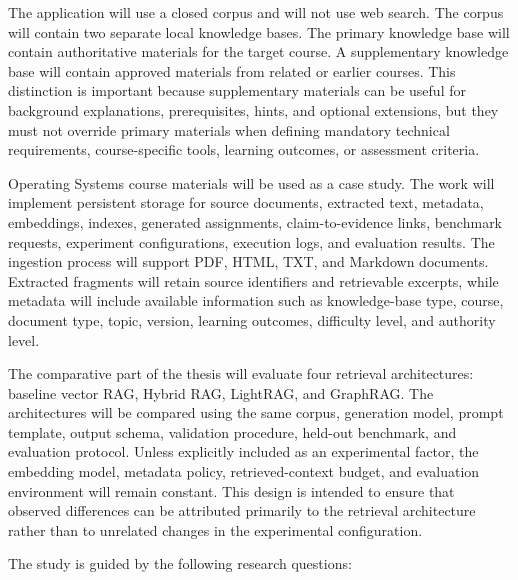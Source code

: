 \documentclass[12pt,a4paper]{report}
\numberwithin{equation}{chapter}
\begin{document}
The application will use a closed corpus and will not use web search. The corpus will contain two separate local knowledge bases. The primary knowledge base will contain authoritative materials for the target course. A supplementary knowledge base will contain approved materials from related or earlier courses. This distinction is important because supplementary materials can be useful for background explanations, prerequisites, hints, and optional extensions, but they must not override primary materials when defining mandatory technical requirements, course-specific tools, learning outcomes, or assessment criteria.

Operating Systems course materials will be used as a case study. The work will implement persistent storage for source documents, extracted text, metadata, embeddings, indexes, generated assignments, claim-to-evidence links, benchmark requests, experiment configurations, execution logs, and evaluation results. The ingestion process will support PDF, HTML, TXT, and Markdown documents. Extracted fragments will retain source identifiers and retrievable excerpts, while metadata will include available information such as knowledge-base type, course, document type, topic, version, learning outcomes, difficulty level, and authority level.

The comparative part of the thesis will evaluate four retrieval architectures: baseline vector RAG, Hybrid RAG, LightRAG, and GraphRAG. The architectures will be compared using the same corpus, generation model, prompt template, output schema, validation procedure, held-out benchmark, and evaluation protocol. Unless explicitly included as an experimental factor, the embedding model, metadata policy, retrieved-context budget, and evaluation environment will remain constant. This design is intended to ensure that observed differences can be attributed primarily to the retrieval architecture rather than to unrelated changes in the experimental configuration.

\clearpage

The study is guided by the following research questions:
\end{document}
